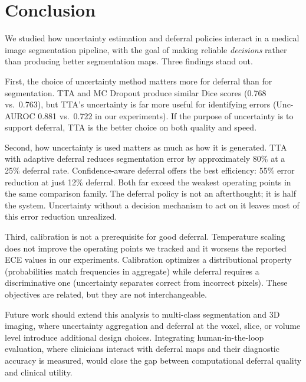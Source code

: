 \section{Conclusion}
\label{sec:conclusion}

We studied how uncertainty estimation and deferral policies interact in
a medical image segmentation pipeline, with the goal of making reliable
\emph{decisions} rather than producing better segmentation maps. Three
findings stand out.

First, the choice of uncertainty method matters more for deferral than for
segmentation. TTA and MC Dropout produce similar Dice scores (0.768 vs.\
0.763), but TTA's uncertainty is far more useful for identifying errors
(Unc-AUROC 0.881 vs.\ 0.722 in our experiments). If the purpose of uncertainty is to support
deferral, TTA is the better choice on both quality and speed.

Second, how uncertainty is used matters as much as how it is generated.
TTA with adaptive deferral reduces segmentation error by approximately 80\%
at a 25\% deferral rate. Confidence-aware deferral offers the best efficiency:
55\% error reduction at just 12\% deferral. Both far exceed the weakest
operating points in the same comparison family. The deferral policy is not an afterthought;
it is half the system. Uncertainty without a decision mechanism to act on it
leaves most of this error reduction unrealized.

Third, calibration is not a prerequisite for good deferral. Temperature
scaling does not improve the operating points we tracked and
it worsens the reported ECE values in our experiments.
Calibration optimizes a distributional property (probabilities match
frequencies in aggregate) while deferral requires a discriminative one
(uncertainty separates correct from incorrect pixels). These objectives
are related, but they are not interchangeable.

Future work should extend this analysis to multi-class segmentation and
3D imaging, where uncertainty aggregation and deferral at the voxel, slice,
or volume level introduce additional design choices. Integrating
human-in-the-loop evaluation, where clinicians interact with deferral maps
and their diagnostic accuracy is measured, would close the gap between
computational deferral quality and clinical utility.
